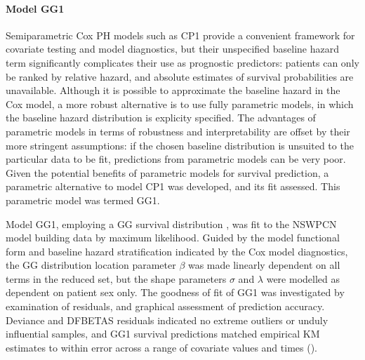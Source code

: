 \documentclass[dissertation.tex]{subfiles}
\begin{document}
\paragraph{Model GG1}
Semiparametric Cox \gls{PH} models such as CP1 provide a convenient framework for covariate testing and model diagnostics, but their unspecified baseline hazard term significantly complicates their use as prognostic predictors: patients can only be ranked by relative hazard, and absolute estimates of survival probabilities are unavailable.  Although it is possible to approximate the baseline hazard in the Cox model, a more robust alternative is to use fully parametric models, in which the baseline hazard distribution is explicity specified.  The advantages of parametric models in terms of robustness and interpretability are offset by their more stringent assumptions: if the chosen baseline distribution is unsuited to the particular data to be fit, predictions from parametric models can be very poor.  Given the potential benefits of parametric models for survival prediction, a parametric alternative to model CP1 was developed, and its fit assessed.  This parametric model was termed GG1.

Model GG1, employing a \gls{GG} survival distribution \cite{Cox2007}, was fit to the \gls{NSWPCN} model building data by maximum likelihood.  Guided by the model functional form and baseline hazard stratification indicated by the Cox model diagnostics, the \gls{GG} distribution location parameter $\beta$ was made linearly dependent on all terms in the reduced set, but the shape parameters $\sigma$ and $\lambda$ were modelled as dependent on patient sex only.  The goodness of fit of GG1 was investigated by examination of residuals, and graphical assessment of prediction accuracy.  Deviance and DFBETAS residuals indicated no extreme outliers or unduly influential samples, and GG1 survival predictions matched empirical \gls{KM} estimates to within error across a range of covariate values and times ().
\end{document}
